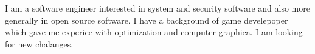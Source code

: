 \documentclass{mycv}
\begin{document}
\begin{paracol}{2}
  \vspace{5mm}

\vspace{1mm}
{\small{
    I am a software engineer interested in system and security software and also more generally in open source software. I have a background of game develepoper which gave me experice with optimization and computer graphica. I am looking for new chalanges.
  }
}

\switchcolumn



\vspace{4mm}


\vspace{15mm}








\vspace{1mm}


\end{paracol}
\end{document}
